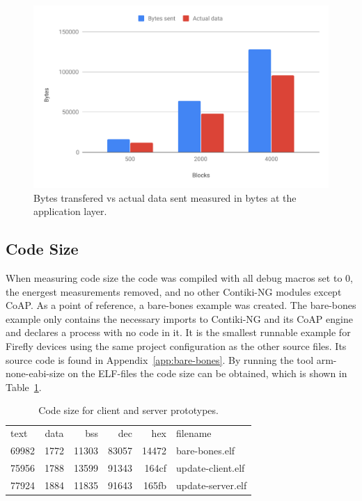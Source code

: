 \documentclass[0-thesis.tex]{subfiles}
\begin{document}
\begin{figure}[h!]
    \caption{Bytes transfered vs actual data sent measured in bytes at the application layer.}
    \label{fig:communication-overhead}
    \includegraphics[scale=0.65]{images/communication-overhead.pdf}
\end{figure}

\subsection{Code Size}
\label{ssec:code-size}
When measuring code size the code was compiled with all debug macros set to 0, the
energest measurements removed, and no other Contiki-NG modules except CoAP. As a point of
reference, a bare-bones example was created. The bare-bones example only contains the
necessary imports to Contiki-NG and its CoAP engine and declares a process with no code in
it. It is the smallest runnable example for Firefly devices using the same project
configuration as the other source files. Its source code is found in
Appendix~\ref{app:bare-bones}. By running the tool arm-none-eabi-size on the ELF-files the
code size can be obtained, which is shown in Table~\ref{tab:code-size}.

\begin{table}[h!]
\begin{tabular}{l c r r r l}
text	&  data	 &  bss	 &  dec	 &  hex&filename\\
69982	&  1772	 &11303	 &83057	 &14472&bare-bones.elf\\
75956	&  1788	 &13599	 &91343	 &164cf&update-client.elf\\
77924	&  1884	 &11835	 &91643	 &165fb&update-server.elf
\end{tabular}
\caption{Code size for client and server prototypes.}
\label{tab:code-size}
\end{table}
\end{document}
